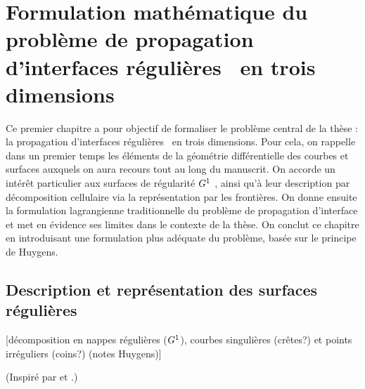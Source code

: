 \chapter[Formulation du problème de propagation d'interfaces $\contgeom{1}$ \piecewise]{Formulation mathématique du problème de propagation d'interfaces régulières \piecewise\ en trois dimensions}
\label{chap:formulation_probleme_propagation}

Ce premier chapitre a pour objectif de formaliser le problème central de la thèse : la propagation d'interfaces régulières \piecewise\ en trois dimensions. 
Pour cela, on rappelle dans un premier temps les éléments de la géométrie différentielle des courbes et surfaces auxquels on aura recours tout au long du manuscrit.
On accorde un intérêt particulier aux surfaces de régularité $\contgeom{1}$ \piecewise, ainsi qu'à leur description par décomposition cellulaire via la représentation par les frontières.
On donne ensuite la formulation lagrangienne traditionnelle du problème de propagation d'interface et met en évidence ses limites dans le contexte de la thèse.
On conclut ce chapitre en introduisant une formulation plus adéquate du problème, basée sur le principe de Huygens.



\section{Description et représentation des surfaces régulières \piecewise}
[décomposition en nappes régulières ($\contgeom{1}$), courbes singulières (crêtes?) et points irréguliers (coins?) (\cf notes Huygens)]
\par\bigskip
(Inspiré par \cite[p.65]{rossignac1985} et \cite[Section 2.6]{rossignac1986}.)\par

